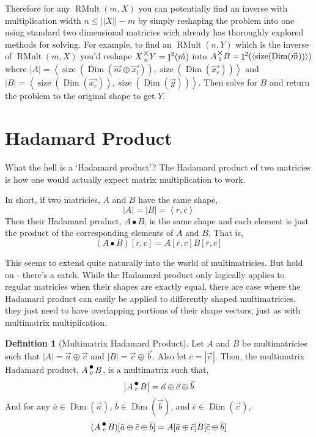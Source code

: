 \documentclass[12pt]{book}
\theoremstyle{plain}
\theoremstyle{definition}
\newtheorem{definition}{Definition}[chapter]
\theoremstyle{ppart}
\theoremstyle{case}
\theoremstyle{solution}
\DeclareMathOperator{\Dim}{Dim}
\DeclareMathOperator{\Ident}{I}
\DeclareMathOperator{\RMult}{RMult}
\DeclareMathOperator{\size}{size}
\newcommand{\mmult}[1]{\text{\raisebox{1ex}{$\underset{#1}{\times}$}}}
\newcommand{\dmult}[1]{\text{\raisebox{1ex}{$\underset{#1}{\,\bullet\,}$}}}
\newcommand{\shape}[1]{\left|#1\right|}
\begin{document}
Therefore for any $\RMult(m,X)$ you can potentially find an inverse with
multiplication width $n \le \shape{\shape{X}}-m$ by simply reshaping the problem into
one using standard two dimensional matricies wich already has thoroughly
explored methods for solving.
For example, to find an $\RMult(n,Y)$ which is the inverse of $\RMult(m,X)$
you'd reshape $X \mmult{n} Y = \Ident^2(\vec{m})$ into $A \mmult{1} B = \Ident^2(\left<\size(\Dim(\vec{m}))\right>)$
where $\shape{A} = \left<\size(\Dim(\vec{m} \oplus \vec{x_l})), \size(\Dim(\vec{x_r}))\right>$
and   $\shape{B} = \left<\size(\Dim(\vec{x_r})),  \size(\Dim(\vec{y}))\right>$.
Then solve for $B$ and return the problem to the original shape to get $Y$.


\section{Hadamard Product}

What the hell is a `Hadamard product'? The Hadamard product \cite{wiki:hadamard}
of two matricies is how one would actually expect matrix multiplication to work.

In short, if two matricies, $A$ and $B$ have the same shape,
\[ \shape{A} = \shape{B} = \left<r,c\right> \]
Then their Hadamard product, $A \bullet B$, is the same shape and each element
is just the product of the corresponding elements of $A$ and $B$. That is,
\[ (A \bullet B)[r,c] = A[r,c] B[r,c] \]

This seems to extend quite naturally into the world of multimatricies.
But hold on - there's a catch. While the Hadamard product only logically applies
to regular matricies when their shapes are exactly equal, there are case where
the Hadamard product can easily be applied to differently shaped multimatricies,
they just need to have overlapping portions of their shape vectors, just as
with multimatrix multiplication.

\begin{definition}[Multimatrix Hadamard Product]
\label{multi_had_prod}
Let $A$ and $B$ be multimatricies such that $\shape{A} = \vec{a} \oplus \vec{c}$
and $\shape{B} = \vec{c} \oplus \vec{b}$. Also let $c = \shape{\vec{c}}$.
Then, the multimatrix Hadamard product, $A \dmult{c} B$, is a multimatrix
such that,
\[ \shape{A \dmult{c} B} = \vec{a} \oplus \vec{c} \oplus \vec{b} \]
And for any $\bar{a} \in \Dim(\vec{a})$, $\bar{b} \in \Dim(\vec{b})$,
and $\bar{c} \in \Dim(\vec{c})$,
\[
  (A \dmult{c} B)[\bar{a} \oplus \bar{c} \oplus \bar{b}]
  = A[\bar{a} \oplus \bar{c}] B[\bar{c} \oplus \bar{b}]
\]
\end{definition}
\end{document}
